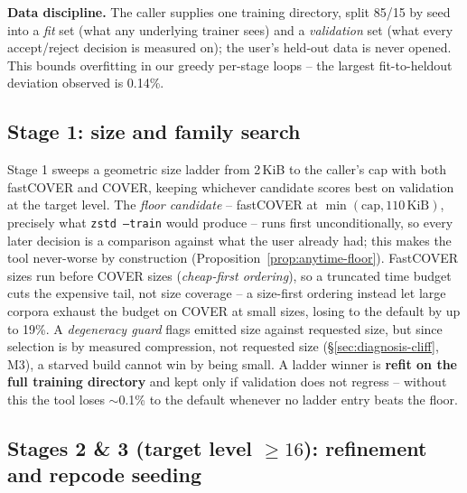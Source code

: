 \documentclass[12pt]{article}
\begin{document}
\textbf{Data discipline.} The caller supplies one training directory,
split 85/15 by seed into a \emph{fit} set (what any underlying trainer
sees) and a \emph{validation} set (what every accept/reject decision is
measured on); the user's held-out data is never opened. This bounds
overfitting in our greedy per-stage loops -- the largest fit-to-heldout
deviation observed is 0.14\%.

\subsection{Stage 1: size and family search}
\label{sec:design-stage1}

Stage 1 sweeps a geometric size ladder from 2\,KiB to the caller's cap
with both fastCOVER and COVER, keeping whichever candidate scores best
on validation at the target level. The \emph{floor candidate} --
fastCOVER at $\min(\text{cap}, 110\,\text{KiB})$, precisely what
\texttt{zstd --train} would produce -- runs first unconditionally, so
every later decision is a comparison against what the user already had;
this makes the tool never-worse by construction
(Proposition~\ref{prop:anytime-floor}). FastCOVER sizes run before
COVER sizes (\emph{cheap-first ordering}), so a truncated time budget
cuts the expensive tail, not size coverage -- a size-first ordering
instead let large corpora exhaust the budget on COVER at small sizes,
losing to the default by up to 19\%. A \emph{degeneracy guard} flags
emitted size against requested size, but since selection is by measured
compression, not requested size (\S\ref{sec:diagnosis-cliff}, M3), a
starved build cannot win by being small. A ladder winner is
\textbf{refit on the full training directory} and kept only if
validation does not regress -- without this the tool loses $\sim$0.1\%
to the default whenever no ladder entry beats the floor.

\subsection{Stages 2 \& 3 (target level $\ge 16$): refinement and repcode seeding}
\label{sec:design-stage2}
\end{document}
